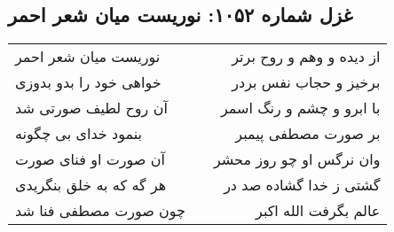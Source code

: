 \begin{center}
\section*{غزل شماره ۱۰۵۲: نوریست میان شعر احمر}
\label{sec:1052}
\begin{longtable}{l p{0.5cm} r}
نوریست میان شعر احمر
&&
از دیده و وهم و روح برتر
\\
خواهی خود را بدو بدوزی
&&
برخیز و حجاب نفس بردر
\\
آن روح لطیف صورتی شد
&&
با ابرو و چشم و رنگ اسمر
\\
بنمود خدای بی چگونه
&&
بر صورت مصطفی پیمبر
\\
آن صورت او فنای صورت
&&
وان نرگس او چو روز محشر
\\
هر گه که به خلق بنگریدی
&&
گشتی ز خدا گشاده صد در
\\
چون صورت مصطفی فنا شد
&&
عالم بگرفت الله اکبر
\\
\end{longtable}
\end{center}
